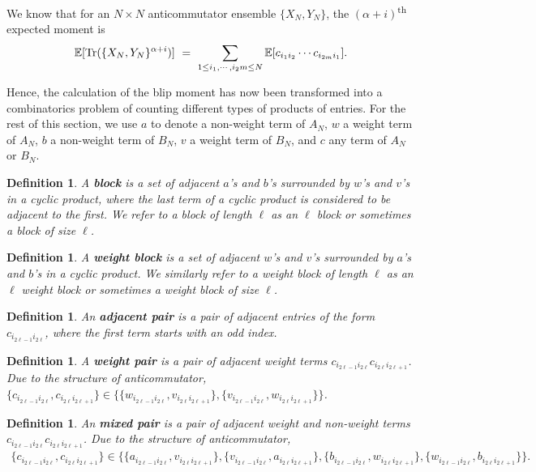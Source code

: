 \documentclass[11pt,reqno]{amsart}
\numberwithin{equation}{section}
\newtheorem{defi}[thm]{Definition}
\theoremstyle{plain}
\begin{document}
We know that for an $N\times N$ anticommutator ensemble $\{X_N, Y_N\}$, the $(\alpha+i)$\textsuperscript{th} expected moment is
\begin{align}
\mathbb{E}[\textup{Tr}(\{X_N, Y_N\}^{\alpha+i})] \ = \ \sum_{1\leq i_1, \cdots, i_2m\leq N}\mathbb{E}[c_{i_1i_2}\cdots c_{i_{2m}i_1}].
\end{align}

Hence, the calculation of the blip moment has now been transformed into a combinatorics problem of counting different types of products of entries. For the rest of this section, we use $a$ to denote a non-weight term of $A_N$, $w$ a weight term of $A_N$, $b$ a non-weight term of $B_N$, $v$ a weight term of $B_N$, and $c$ any term of $A_N$ or $B_N$.

\begin{defi}
A \textbf{block} is a set of adjacent $a$'s and $b$'s surrounded by $w$'s and $v$'s in a cyclic product, where the last term of a cyclic product is considered to be adjacent to the first. We refer to a block of length $\ell$ as an $\ell$ block or sometimes a block of size $\ell$.
\end{defi}

\begin{defi}
A \textbf{weight block} is a set of adjacent $w$'s and $v$'s surrounded by $a$'s and $b$'s in a cyclic product. We similarly refer to a weight block of length $\ell$ as an $\ell$ weight block or sometimes a weight block of size $\ell$.
\end{defi}

\begin{defi}
An \textbf{adjacent pair} is a pair of adjacent entries of the form $c_{i_{2\ell-1}i_{2\ell}}$, where the first term starts with an odd index.
\end{defi}

\begin{defi}
A \textbf{weight pair} is a pair of adjacent weight terms $c_{i_{2\ell -1}i_{2\ell}}c_{i_{2\ell}i_{2\ell+1}}$. Due to the structure of anticommutator, $\{c_{i_{2\ell -1}i_{2\ell}}, c_{i_{2\ell}i_{2\ell+1}}\}\in \{\{w_{i_{2\ell -1}i_{2\ell}}, v_{i_{2\ell}i_{2\ell+1}}\}, \{v_{i_{2\ell -1}i_{2\ell}},w_{i_{2\ell}i_{2\ell+1}}\}\}$.
\end{defi}

\begin{defi}
An \textbf{mixed pair} is a pair of adjacent weight and non-weight terms $c_{i_{2\ell-1}i_{2\ell}}c_{i_{2\ell}i_{2\ell+1}}$. Due to the structure of anticommutator, 
\begin{align}
\{c_{i_{2\ell-1}i_{2\ell}}, c_{i_{2\ell}i_{2\ell+1}}\}\in \{\{a_{i_{2\ell-1}i_{2\ell}}, v_{i_{2\ell}i_{2\ell+1}}\}, \{v_{i_{2\ell-1}i_{2\ell}}, a_{i_{2\ell}i_{2\ell+1}}\}, \{b_{i_{2\ell-1}i_{2\ell}}, w_{i_{2\ell}i_{2\ell+1}}\}, \{w_{i_{2\ell-1}i_{2\ell}}, b_{i_{2\ell}i_{2\ell+1}}\}\}.
\end{align}
\end{defi}
\end{document}
